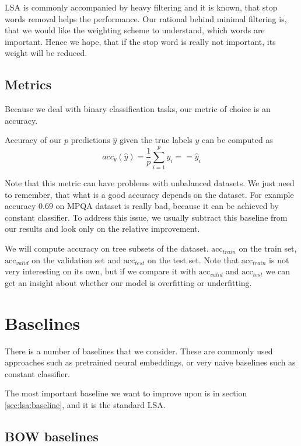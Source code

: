     LSA is commonly accompanied by heavy filtering and it is known, that stop words removal helps the performance.
    Our rational behind minimal filtering is, that we would like the weighting scheme to understand, which words are important.
    Hence we hope, that if the stop word is really not important, its weight will be reduced.
    
    \subsection{Metrics}
    
    Because we deal with binary classification tasks, our metric of choice is an accuracy.
    
    Accuracy of our $p$ predictions $\hat{y}$ given the true labels $y$ can be computed as
    $$acc_y(\hat{y}) = \frac{1}{p}\sum_{i=1}^py_i ==\hat{y}_i$$
    
    Note that this metric can have problems with unbalanced datasets. 
    We just need to remember, that what is a good accuracy depends on the dataset.
    For example accuracy $0.69$ on MPQA dataset is really bad, because it can be achieved by constant classifier.
    To address this issue, we usually subtract this baseline from our results and look only on the relative improvement. 
    
    We will compute accuracy on tree subsets of the dataset. 
    $\mathrm{acc}_{train}$ on the train set, $\mathrm{acc}_{valid}$ on the validation set and $\mathrm{acc}_{test}$ on the test set.
    Note that $\mathrm{acc}_{train}$ is not very interesting on its own, but if we compare it with $\mathrm{acc}_{valid}$ and $\mathrm{acc}_{test}$ we can get an insight about whether our model is overfitting or underfitting.


\section{Baselines} \label{sec:baseline}

    There is a number of baselines that we consider.
    These are commonly used approaches such as pretrained neural embeddings, or very naive baselines such as constant classifier.
    
    The most important baseline we want to improve upon is in section \ref{sec:lsa:baseline}, 
    and it is the standard LSA.

    \subsection{BOW baselines}
    
